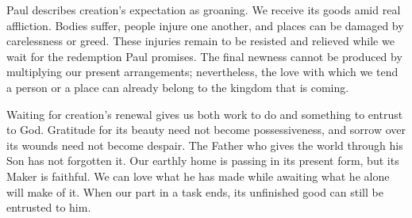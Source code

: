 Paul describes creation's expectation as groaning. We receive its goods amid real affliction. Bodies suffer, people injure one another, and places can be damaged by carelessness or greed. These injuries remain to be resisted and relieved while we wait for the redemption Paul promises. The final newness cannot be produced by multiplying our present arrangements; nevertheless, the love with which we tend a person or a place can already belong to the kingdom that is coming.

Waiting for creation's renewal gives us both work to do and something to entrust to God. Gratitude for its beauty need not become possessiveness, and sorrow over its wounds need not become despair. The Father who gives the world through his Son has not forgotten it. Our earthly home is passing in its present form, but its Maker is faithful. We can love what he has made while awaiting what he alone will make of it. When our part in a task ends, its unfinished good can still be entrusted to him.

